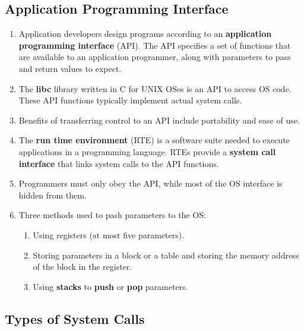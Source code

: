 \documentclass[journal,12pt,twocolumn]{IEEEtran}
\begin{document}
\subsection{Application Programming Interface}
\begin{enumerate}
    \item Application developers design programs according to an
    \textbf{application programming interface} (API). The API specifies a set
    of functions that are available to an application programmer, along with 
    parameters to pass and return values to expect.
    \item The \textbf{libc} library written in C for UNIX OSes is an API to
    access OS code. These API functions typically implement actual system 
    calls.
    \item Benefits of transferring control to an API include portability
    and ease of use.
    \item The \textbf{run time environment} (RTE) is a software suite needed to
    execute applications in a programming language. RTEs provide a 
    \textbf{system call interface} that links system calls to the API functions.
    \item Programmers must only obey the API, while most of the OS interface
    is hidden from them.
    \item Three methods used to pash parameters to the OS:
    \begin{enumerate}
        \item Using registers (at most five parameters).
        \item Storing parameters in a block or a table and storing the memory 
        address of the block in the register.
        \item Using \textbf{stacks} to \textbf{push} or \textbf{pop} parameters.
    \end{enumerate}
\end{enumerate}

\subsection{Types of System Calls}
\end{document}
